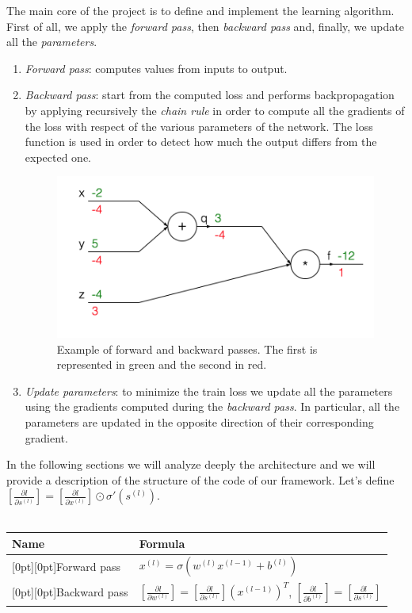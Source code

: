 \documentclass[journal, a4paper]{IEEEtran}
\begin{document}
The main core of the project is to define and implement the learning algorithm. First of all, we apply the \textit{forward pass}, then \textit{backward pass} and, finally, we update all the \textit{parameters}.
\begin{enumerate}
    \item \textit{Forward pass}:
computes values from inputs to output.
 \item \textit{Backward pass}:
start from the computed loss and performs backpropagation by applying recursively the \textit{chain rule} in order to compute all the gradients of the loss with respect of the various parameters of the network. The loss function is used in order to detect how much the output differs from the expected one.
\begin{figure}
    \centering
    \includegraphics[width=0.8\linewidth]{backandfor.png}
    \caption{Example of forward and backward passes. The first is represented in green and the second in red. \cite{reference0}}
    \label{fig:my_label}
\end{figure}
\item \textit{Update parameters}:
to minimize the train loss we update all the parameters using the gradients computed during the \textit{backward pass}. In particular, all the parameters are updated in the opposite direction of their corresponding gradient.
\end{enumerate}
In the following sections we will analyze deeply the architecture and we will provide a description of the structure of the code of our framework.
Let's define $\left[ \frac{\partial l}{\partial s^{(l)}}\right] = \left[ \frac{\partial l}{\partial x^{(l)}}\right] \odot \sigma ' (s^{(l)})$.
\\
\\
\begin{tabular}{*{2}{l} }
  \toprule
  \textbf{Name} & \textbf{Formula} \\
  \midrule
  \raisebox{-.01\normalbaselineskip}[0pt][0pt]{Forward pass} &
    $x^{(l)} = \sigma (w^{(l)}x^{(l-1)} + b^{(l)})$\\
  \raisebox{-.01\normalbaselineskip}[0pt][0pt]{Backward pass} &
    $\left[\frac{\partial l}{\partial w^{(l)}}\right] =\left[\frac{\partial l}{\partial s^{(l)}} \right] \left( x^{(l-1)}\right)^T$, $\left[\frac{\partial l}{\partial b^{(l)}}\right] = \left[\frac{\partial l}{\partial s^{(l)}}\right]$\\
  \bottomrule
\end{tabular}
\end{document}

